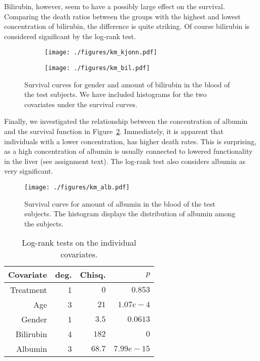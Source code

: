\documentclass[11pt,a4paper]{article}
\begin{document}
Bilirubin, however, seem to have a possibly large effect on the survival. Comparing the death ratios between the groups with the highest and lowest concentration of bilirubin, the difference is quite striking. Of course bilirubin is considered significant by the log-rank test.
%
\begin{figure}[h!tbp]
    \centering
    \begin{subfigure}[b]{0.48\textwidth}
        \texttt{[image: ./figures/km\_kjonn.pdf]}
    \end{subfigure}%
    \quad
    \begin{subfigure}[b]{0.48\textwidth}
        \texttt{[image: ./figures/km\_bil.pdf]}
    \end{subfigure}
    \vspace{1\baselineskip}
    \caption{Survival curves for gender and amount of bilirubin in the blood of the test subjects. We have included histograms for the two covariates under the survival curves.}
    \label{fig:km_kjonn_bil}
\end{figure}

Finally, we investigated the relationship between the concentration of albumin and the survival function in Figure~\ref{fig:km_alb}. Immediately, it is apparent that individuals with a lower concentration, has higher death rates. This is surprising, as a high concentration of albumin is usually connected to lowered functionality in the liver (see assignment text).
The log-rank test also considers albumin as very significant.

\begin{figure}[h!tb]
    \begin{center}
        \texttt{[image: ./figures/km\_alb.pdf]}
    \end{center}
    \vspace{-0.8cm}
    \caption{Survival curve for amount of albumin in the blood of the test subjects. The histogram displays the distribution of albumin among the subjects.}
    \label{fig:km_alb}
\end{figure}

\begin{table}[h!tbp]
    \centering
    \caption{Log-rank tests on the individual covariates.}
    \label{tab:log_rank_indiv}
    \begin{tabular}{rrrr}
        \hline
        Covariate & deg. & Chisq. & $p$ \\ 
        \hline
        Treatment &  1 &  $0   $ & $0.853     $ \\
        Age       &  3 &  $21  $ & $1.07e-4   $ \\ 
        Gender    &  1 &  $3.5 $ & $0.0613    $ \\ 
        Bilirubin &  4 &  $182 $ & $0         $ \\ 
        Albumin   &  3 &  $68.7$ & $7.99e-15$ \\ 
        \hline
    \end{tabular}
\end{table}
\end{document}
